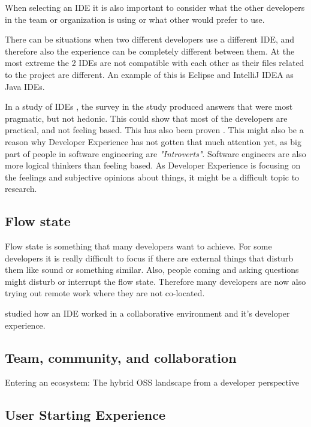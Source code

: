 \documentclass[english, 12pt, a4paper, sci, utf8, a-1b, online]{aaltothesis}
\begin{document}
When selecting an IDE it is also important to consider what the other developers in the team or organization is using or what other would prefer to use.

There can be situations when two different developers use a different IDE, and therefore also the experience can be completely different between them. At the most extreme the 2 IDEs are not compatible with each other as their files related to the project are different. An example of this is Eclipse and IntelliJ IDEA as Java IDEs.

In a study of IDEs \citep{software-developers-as-users}, the survey in the study produced answers that were most pragmatic, but not hedonic. This could show that most of the developers are practical, and not feeling based. This has also been proven \citep{personality-software}. This might also be a reason why Developer Experience has not gotten that much attention yet, as big part of people in software engineering are \textit{"Introverts"}. Software engineers are also more logical thinkers than feeling based. As Developer Experience is focusing on the feelings and subjective opinions about things, it might be a difficult topic to research.

\subsection{Flow state}

Flow state is something that many developers want to achieve. For some developers it is really difficult to focus if there are external things that disturb them like sound or something similar. Also, people coming and asking questions might disturb or interrupt the flow state. Therefore many developers are now also trying out remote work where they are not co-located.

\cite{design-framework-enchancing} studied how an IDE worked in a collaborative environment and it's developer experience.

\subsection{Team, community, and collaboration}

{\color{gray} Entering an ecosystem: The hybrid OSS landscape from a developer perspective}

\subsection{User Starting Experience}
\end{document}
